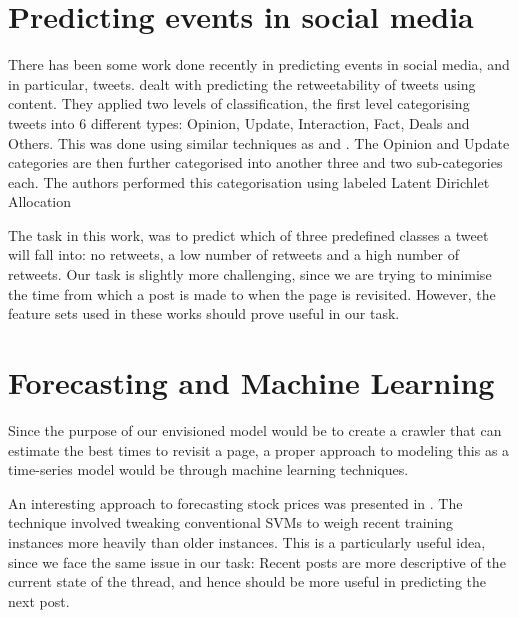 \section{Predicting events in social media}
There has been some work done recently in predicting events in social media, and 
in particular, tweets.   dealt with predicting the retweetability 
of tweets using content. They applied two levels of classification, the first 
level categorising tweets into 6 different types: Opinion, Update, Interaction, 
Fact, Deals and Others. This was done using similar techniques as 
 and . The Opinion and Update categories 
are then further categorised into another three and two sub-categories each. The 
authors performed this categorisation using labeled Latent Dirichlet Allocation 

The task in this work, was to predict which of three predefined classes a tweet 
will fall into: no retweets, a low number of retweets and a high number of retweets. 
Our task is slightly more challenging, 
since we are trying to minimise the time from which a post is made to when the 
page is revisited. However, the feature sets used in these works should prove 
useful in our task.  

\section{Forecasting and Machine Learning}
Since the purpose of our envisioned model would be to create a crawler that can estimate the best times to revisit a page, a proper approach to modeling this as a time-series model would be through machine learning techniques.

An interesting approach to forecasting stock prices was presented in . The technique involved tweaking conventional SVMs to weigh recent training instances more heavily than older instances. This is a particularly useful idea, since we face the same issue in our task: Recent posts are more descriptive of the current state of the thread, and hence should be more useful in predicting the next post.

